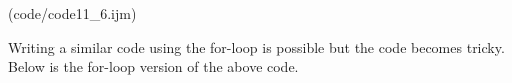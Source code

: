 (code/code11_6.ijm)

Writing a similar code using the for-loop is possible but the code becomes tricky.
Below is the for-loop version of the above code.